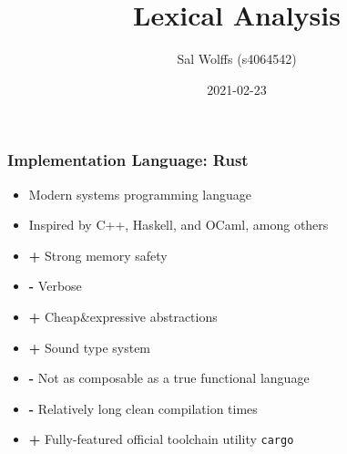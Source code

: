 \documentclass{article}
\title{Lexical Analysis}
\author{Sal Wolffs (s4064542)}
\date{2021-02-23}
\begin{document}
\begin{frame}
\titlepage
\end{frame}

\begin{frame}
\frametitle{Implementation Language: Rust}
    \begin{itemize}[<+(1)->]
        \item Modern systems programming language
        \item Inspired by C++, Haskell, and OCaml, among others
        \item \color{green} \textbf{+} Strong memory safety
        \item \color{red} \hspace{1mm}\textbf{-}\hspace{1mm} Verbose
        \item \color{green} \textbf{+} Cheap\&expressive abstractions
        \item \color{green} \textbf{+} Sound type system
        \item \color{red} \hspace{1mm}\textbf{-}\hspace{1mm} Not as composable as a true functional language
        \item \color{red} \hspace{1mm}\textbf{-}\hspace{1mm} Relatively long clean compilation times 
        \item \color{green} \textbf{+} Fully-featured official toolchain utility \texttt{cargo}
    \end{itemize}
\end{frame}
\end{document}
